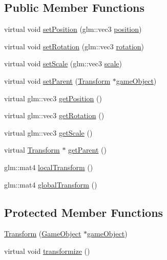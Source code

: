 \subsection*{Public Member Functions}
\begin{DoxyCompactItemize}
\item 
virtual void \hyperlink{class_mason_1_1_transform_a740f389e20c0190c52bcb893aeaa0490}{set\+Position} (glm\+::vec3 \hyperlink{class_mason_1_1_transform_ac9e11b4ec4433a38ac1100f12c955dcb}{position})
\item 
virtual void \hyperlink{class_mason_1_1_transform_aacc2b668bdd1d9b978aa0edccf75144a}{set\+Rotation} (glm\+::vec3 \hyperlink{class_mason_1_1_transform_ae2f541ade79d561584619e93edb034ae}{rotation})
\item 
virtual void \hyperlink{class_mason_1_1_transform_a4a273ac58f45b6ee9cf2b37cf661daac}{set\+Scale} (glm\+::vec3 \hyperlink{class_mason_1_1_transform_a4618b31e34a6ec8a0ee638401fc56367}{scale})
\item 
virtual void \hyperlink{class_mason_1_1_transform_a6e1a6b57214a7de21595e6af8b05138b}{set\+Parent} (\hyperlink{class_mason_1_1_transform}{Transform} $\ast$\hyperlink{class_mason_1_1_component_a30030370c35f5562cbbbb0927b0448c8}{game\+Object})
\item 
virtual glm\+::vec3 \hyperlink{class_mason_1_1_transform_a0b21f641e72d7b55f3a630b986d0b106}{get\+Position} ()
\item 
virtual glm\+::vec3 \hyperlink{class_mason_1_1_transform_a7367502d4344eff2d88a250084ae19dc}{get\+Rotation} ()
\item 
virtual glm\+::vec3 \hyperlink{class_mason_1_1_transform_a24107560725b250c4c2e10ab98a6ac04}{get\+Scale} ()
\item 
virtual \hyperlink{class_mason_1_1_transform}{Transform} $\ast$ \hyperlink{class_mason_1_1_transform_ae3e8acbd25d7d171aff00da038f79a9a}{get\+Parent} ()
\item 
glm\+::mat4 \hyperlink{class_mason_1_1_transform_a8b85abc03488f58bef8bb78df77c1689}{local\+Transform} ()
\item 
glm\+::mat4 \hyperlink{class_mason_1_1_transform_a35e627aa09604bf3a81f4c07d28205f3}{global\+Transform} ()
\end{DoxyCompactItemize}
\subsection*{Protected Member Functions}
\begin{DoxyCompactItemize}
\item 
\hyperlink{class_mason_1_1_transform_a00209266b27fa0c297551a0ce4a07017}{Transform} (\hyperlink{class_mason_1_1_game_object}{Game\+Object} $\ast$\hyperlink{class_mason_1_1_component_a30030370c35f5562cbbbb0927b0448c8}{game\+Object})
\item 
virtual void \hyperlink{class_mason_1_1_transform_a4dd61568d49044377f3312397ffdafd1}{transformize} ()
\end{DoxyCompactItemize}
